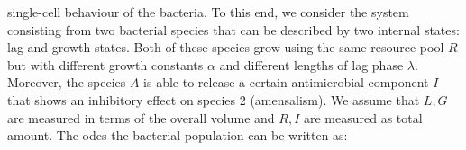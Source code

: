 \documentclass[10pt,twocolumn,5p]{elsarticle}
\numberwithin{equation}{section}
\begin{document}
single-cell behaviour of the bacteria.
To this end, we consider the system consisting from two bacterial species that can be described by two internal states: lag and growth states.
Both of these species grow using the same resource pool $R$ but with different growth constants
$\alpha$ and different lengths of lag phase $\lambda$.
Moreover, the species $A$ is able to release a certain antimicrobial component $I$ that shows an
inhibitory effect on species 2 (amensalism).
We assume that $L,G$ are measured in terms of the overall volume and $R,I$ are measured as total
amount.
The \acp{ode} the bacterial population can be written as:
%
%
%
%
%
\end{document}

